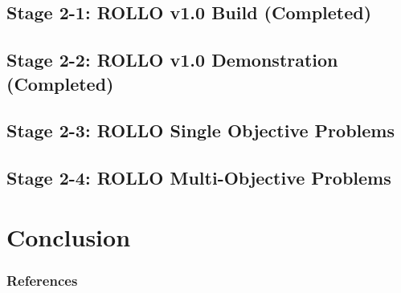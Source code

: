 \documentclass[9pt]{beamer}
\begin{document}
\subsection{Stage 2-1: ROLLO v1.0 Build (Completed)}

\subsection{Stage 2-2: ROLLO v1.0 Demonstration (Completed)}

\subsection{Stage 2-3: ROLLO Single Objective Problems}

\subsection{Stage 2-4: ROLLO Multi-Objective Problems}


\section{Conclusion}


%
\begin{frame}[allowframebreaks]
  \frametitle{References}
  
  {\footnotesize  }

\end{frame}

\end{document}
